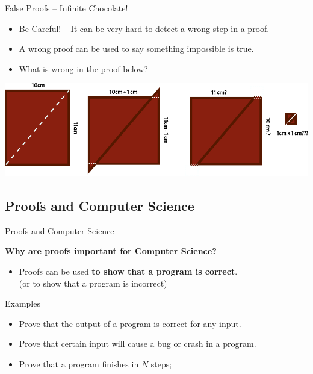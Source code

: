 \begin{frame}{False Proofs -- Infinite Chocolate!}
  \begin{block}{}
    \begin{itemize}
      \item \alert{Be Careful!} -- It can be very hard to detect a wrong step in a proof.
      \item A wrong proof can be used to say something impossible is true.
      \item What is wrong in the proof below? 
    \end{itemize}
  \end{block}

  \begin{center}
    \includegraphics[width=.9\textwidth]{../img/false_proof}
  \end{center}
\end{frame}

\subsection{Proofs and Computer Science}

\begin{frame}[t]{Proofs and Computer Science}

  \begin{center}
    {\bf Why are proofs important for Computer Science?}
  \end{center}
  \bigskip

  \begin{itemize}
    \item Proofs can be used {\bf to show that a program is correct}.\\
    (or to show that a program is incorrect)
  \end{itemize}

  \vfill

  \begin{block}{Examples}
    \begin{itemize}
      \item Prove that the output of a program is correct for any input.
      \item Prove that certain input will cause a bug or crash in a program.
      \item Prove that a program finishes in $N$ steps;
    \end{itemize}
  \end{block}


\end{frame}

